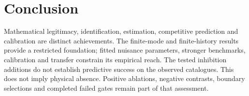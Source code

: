\section{Conclusion}

Mathematical legitimacy, identification, estimation, competitive prediction and calibration are distinct achievements. The finite-mode and finite-history results provide a restricted foundation; fitted nuisance parameters, stronger benchmarks, calibration and transfer constrain its empirical reach. The tested inhibition additions do not establish predictive success on the observed catalogues. This does not imply physical absence. Positive ablations, negative contrasts, boundary selections and completed failed gates remain part of that assessment.
